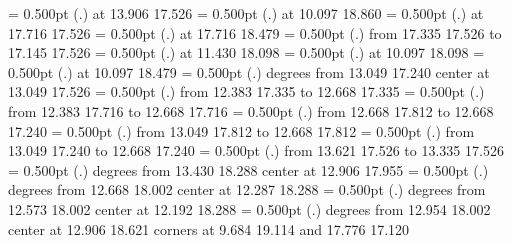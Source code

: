 {{}%
%
%
\linethickness= 0.500pt
\setplotsymbol ({\thinlinefont .})
{\color[rgb]{0,0,0} at 13.906 17.526
}%
%
%
\linethickness= 0.500pt
\setplotsymbol ({\thinlinefont .})
{\color[rgb]{0,0,0} at 10.097 18.860
}%
%
%
\linethickness= 0.500pt
\setplotsymbol ({\thinlinefont .})
{\color[rgb]{0,0,0} at 17.716 17.526
}%
%
%
\linethickness= 0.500pt
\setplotsymbol ({\thinlinefont .})
{\color[rgb]{0,0,0} at 17.716 18.479
}%
%
%
\linethickness= 0.500pt
\setplotsymbol ({\thinlinefont .})
{\color[rgb]{0,0,0}\putrule from 17.335 17.526 to 17.145 17.526
}%
%
%
\linethickness= 0.500pt
\setplotsymbol ({\thinlinefont .})
{\color[rgb]{0,0,0} at 11.430 18.098
}%
%
%
\linethickness= 0.500pt
\setplotsymbol ({\thinlinefont .})
{\color[rgb]{0,0,0} at 10.097 18.098
}%
%
%
\linethickness= 0.500pt
\setplotsymbol ({\thinlinefont .})
{\color[rgb]{0,0,0} at 10.097 18.479
}%
%
%
\linethickness= 0.500pt
\setplotsymbol ({\thinlinefont .})
{\color[rgb]{0,0,0} degrees from 13.049 17.240 center at 13.049 17.526
}%
%
%
\linethickness= 0.500pt
\setplotsymbol ({\thinlinefont .})
{\color[rgb]{0,0,0}\putrule from 12.383 17.335 to 12.668 17.335
}%
%
%
\linethickness= 0.500pt
\setplotsymbol ({\thinlinefont .})
{\color[rgb]{0,0,0}\putrule from 12.383 17.716 to 12.668 17.716
}%
%
%
\linethickness= 0.500pt
\setplotsymbol ({\thinlinefont .})
{\color[rgb]{0,0,0}\putrule from 12.668 17.812 to 12.668 17.240
}%
%
%
\linethickness= 0.500pt
\setplotsymbol ({\thinlinefont .})
{\color[rgb]{0,0,0}\putrule from 13.049 17.812 to 12.668 17.812
}%
%
%
\linethickness= 0.500pt
\setplotsymbol ({\thinlinefont .})
{\color[rgb]{0,0,0}\putrule from 13.049 17.240 to 12.668 17.240
}%
%
%
\linethickness= 0.500pt
\setplotsymbol ({\thinlinefont .})
{\color[rgb]{0,0,0}\putrule from 13.621 17.526 to 13.335 17.526
}%
%
%
\linethickness= 0.500pt
\setplotsymbol ({\thinlinefont .})
{\color[rgb]{0,0,0} degrees from 13.430 18.288 center at 12.906 17.955
}%
%
%
\linethickness= 0.500pt
\setplotsymbol ({\thinlinefont .})
{\color[rgb]{0,0,0} degrees from 12.668 18.002 center at 12.287 18.288
}%
%
%
\linethickness= 0.500pt
\setplotsymbol ({\thinlinefont .})
{\color[rgb]{0,0,0} degrees from 12.573 18.002 center at 12.192 18.288
}%
%
%
\linethickness= 0.500pt
\setplotsymbol ({\thinlinefont .})
{\color[rgb]{0,0,0} degrees from 12.954 18.002 center at 12.906 18.621
}%
\linethickness=0pt
\putrectangle corners at  9.684 19.114 and 17.776 17.120
\endpicture}
